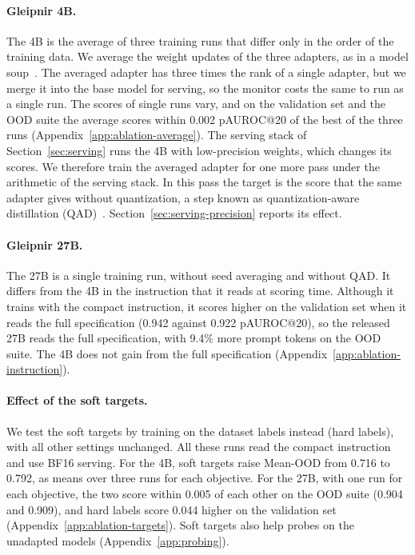 \paragraph{Gleipnir 4B.}
The 4B is the average of three training runs that differ only in the order of the training data.
We average the weight updates of the three adapters, as in a model soup~\citep{wortsman2022soups}.
The averaged adapter has three times the rank of a single adapter, but we merge it into the base model for serving, so the monitor costs the same to run as a single run.
The scores of single runs vary, and on the validation set and the OOD suite the average scores within 0.002 pAUROC@20 of the best of the three runs (Appendix~\ref{app:ablation-average}).
The serving stack of Section~\ref{sec:serving} runs the 4B with low-precision weights, which changes its scores.
We therefore train the averaged adapter for one more pass under the arithmetic of the serving stack.
In this pass the target is the score that the same adapter gives without quantization, a step known as quantization-aware distillation (QAD)~\citep{xin2026qad}.
Section~\ref{sec:serving-precision} reports its effect.

\paragraph{Gleipnir 27B.}
The 27B is a single training run, without seed averaging and without QAD.
It differs from the 4B in the instruction that it reads at scoring time.
Although it trains with the compact instruction, it scores higher on the validation set when it reads the full specification (0.942 against 0.922 pAUROC@20), so the released 27B reads the full specification, with 9.4\% more prompt tokens on the OOD suite.
The 4B does not gain from the full specification (Appendix~\ref{app:ablation-instruction}).

\paragraph{Effect of the soft targets.}
We test the soft targets by training on the dataset labels instead (hard labels), with all other settings unchanged.
All these runs read the compact instruction and use BF16 serving.
For the 4B, soft targets raise Mean-OOD from 0.716 to 0.792, as means over three runs for each objective.
For the 27B, with one run for each objective, the two score within 0.005 of each other on the OOD suite (0.904 and 0.909), and hard labels score 0.044 higher on the validation set (Appendix~\ref{app:ablation-targets}).
Soft targets also help probes on the unadapted models (Appendix~\ref{app:probing}).
